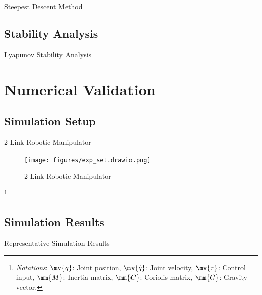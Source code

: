 \documentclass[8pt, aspectratio=169]{beamer}
\begin{document}
\begin{frame}{\insertsubsectionhead}{Steepest Descent Method}


\end{frame}
\subsection{Stability Analysis}

\begin{frame}{\insertsubsectionhead}{Lyapunov Stability Analysis}


\end{frame}

\section{Numerical Validation}

\subsection{Simulation Setup}
\begin{frame}{\insertsubsectionhead}{2-Link Robotic Manipulator}
    
  \begin{figure}
    \centering
    \texttt{[image: figures/exp\_set.drawio.png]}
    \caption{2-Link Robotic Manipulator}
  \end{figure}

  \let\thefootnote\relax\footnote{
    \textit{Notations}: 
      $\mv{q}$: Joint position, $\mv{\dot{q}}$: Joint velocity, $\mv{\tau}$: Control input, $\mm{M}$: Inertia matrix, $\mm{C}$: Coriolis matrix, $\mm{G}$: Gravity vector.
  }


\end{frame}

\subsection{Simulation Results}

\begin{frame}{Representative Simulation Results}




\end{frame}
\end{document}
